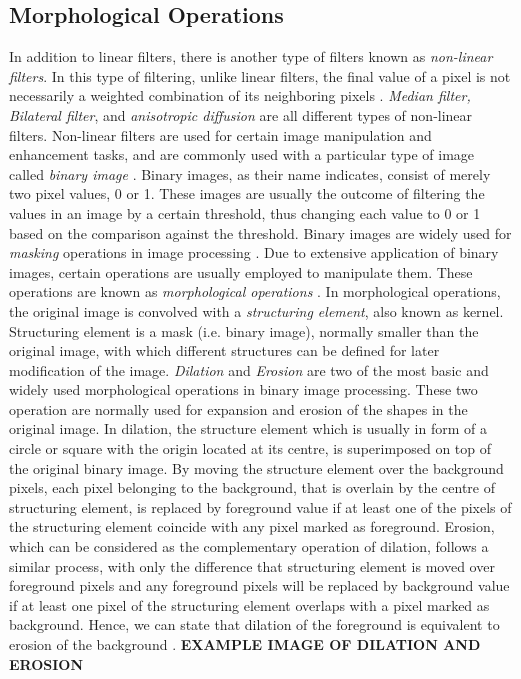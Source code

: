 \documentclass[12pt]{report}
\begin{document}
\subsection{Morphological Operations}
In addition to linear filters, there is another type of filters known as {\it non-linear filters}. In this type of filtering, unlike linear filters, the final value of a pixel is not necessarily 
a weighted combination of its neighboring pixels \cite{sze11}. 
{\it Median filter, Bilateral filter}, and {\it anisotropic diffusion} are all different types of non-linear filters. Non-linear filters are used for certain image manipulation 
and enhancement tasks, and are commonly used with a particular type of image called {\it binary
image} \cite{sze11}. Binary images, as their name indicates, consist of merely two pixel values, 0 or 1. These images are usually the outcome of filtering the values in an image 
by a certain threshold, thus changing each value to 0 or 1 based on the comparison against the threshold. Binary images are
widely used for {\it masking} operations in image processing \cite{sze11}. Due to extensive application of binary images, certain operations are usually employed to manipulate them. 
These operations are known as {\it morphological operations} \cite{sze11}.
In morphological operations, the original image is convolved with a {\it structuring element}, also known as kernel. 
Structuring element is a mask (i.e. binary image), normally smaller than the original image, 
with which different structures can be defined for later modification of the image. 
{\it Dilation} and {\it Erosion} are two of the most basic and widely used morphological operations in binary image processing.
These two operation are normally used for expansion and erosion of the shapes in the original image. 
In dilation, the structure element which is usually in form of a circle or square with the origin located at its centre, is superimposed on top of the original binary image.
By moving the structure element over the background pixels, each pixel belonging to the background, that 
is overlain by the centre of structuring element, is replaced by foreground value if at least one of the pixels of the structuring element coincide with any pixel marked as foreground.
Erosion, which can be considered as the complementary operation of dilation, follows a similar process, with only the difference that structuring element is moved over foreground pixels and any
foreground pixels will be replaced by background value if at least one pixel of the structuring element overlaps with a pixel marked as background.
Hence, we can state that dilation of the foreground is equivalent to erosion of the background \cite{ritt96}.
\textbf {EXAMPLE IMAGE OF DILATION AND EROSION}
\end{document}
